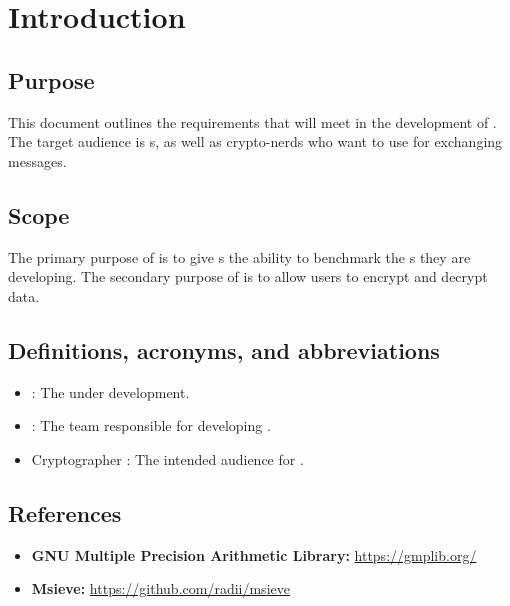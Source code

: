 \section{Introduction}
\md


\subsection{Purpose}

This document outlines the requirements that \tc{} will meet
in the development of \cry{}. The target audience is \cg s,
as well as crypto-nerds who want to use
\cry{} for exchanging messages.


\subsection{Scope}

The primary purpose of \cry{} is to give \cg s the ability
to benchmark the \cs s they are developing. The secondary
purpose of \cry{} is to allow users to encrypt and decrypt
data.


\subsection{Definitions, acronyms, and abbreviations}

\begin{itemize}
\item \cry{}: The \cf{}  under development.
\item \tc{}: The team responsible for developing \cry{}.
\item Cryptographer : The intended audience for \cry{}.
\end{itemize}


\subsection{References}

\begin{itemize}
  \item \textbf{GNU Multiple Precision Arithmetic Library:}
        \url{https://gmplib.org/}
  \item \textbf{Msieve:} \url{https://github.com/radii/msieve}
\end{itemize}

